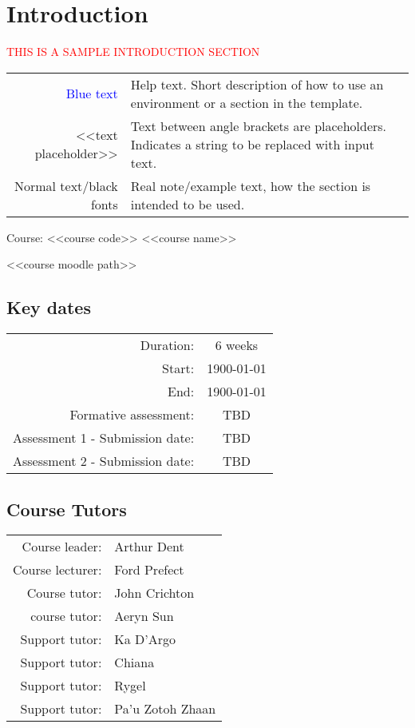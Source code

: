 \section{Introduction}

{\begin{center}
    \textcolor{red}{\Huge{THIS IS A SAMPLE INTRODUCTION SECTION}}

    \begin{tabular}{r @{: } p{80mm}}
        {\textcolor{blue}{Blue text}} &  Help text. Short description of how to use an environment or a section in the template.\\
        <<text placeholder>> & Text between angle brackets are placeholders. Indicates a string to be replaced with input text.\\
        Normal text/black fonts & Real note/example text, how the section is intended to be used.
    \end{tabular}

\end{center}


{\huge{Course: <<course code>> <<course name>>}}

<<course moodle path>>

\subsection{Key dates}

\begin{tabular}{r @{ } c}
    Duration: & 6 weeks\\
    Start: & 1900-01-01\\
    End: & 1900-01-01\\
    Formative assessment: & TBD\\
    Assessment 1 - Submission date: & TBD\\
    Assessment 2 - Submission date: & TBD\\
\end{tabular}

\subsection{Course Tutors}

\begin{tabular}{r @{ } l}
    Course leader: & Arthur Dent\\
    Course lecturer: & Ford Prefect\\
    Course tutor: & John Crichton\\
    course tutor: & Aeryn Sun\\
    Support tutor: & Ka D'Argo\\
    Support tutor: & Chiana\\
    Support tutor: & Rygel\\
    Support tutor: & Pa'u Zotoh Zhaan\\
\end{tabular}

}
